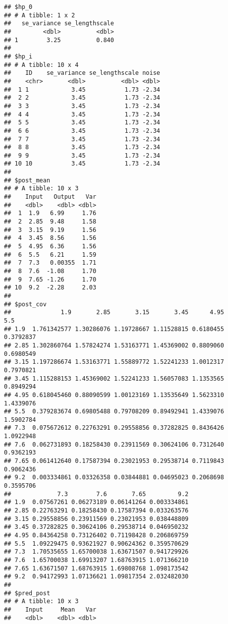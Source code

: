 \documentclass[
]{article}
\begin{document}
\begin{verbatim}
## $hp_0
## # A tibble: 1 x 2
##   se_variance se_lengthscale
##         <dbl>          <dbl>
## 1        3.25          0.840
## 
## $hp_i
## # A tibble: 10 x 4
##    ID    se_variance se_lengthscale noise
##    <chr>       <dbl>          <dbl> <dbl>
##  1 1            3.45           1.73 -2.34
##  2 2            3.45           1.73 -2.34
##  3 3            3.45           1.73 -2.34
##  4 4            3.45           1.73 -2.34
##  5 5            3.45           1.73 -2.34
##  6 6            3.45           1.73 -2.34
##  7 7            3.45           1.73 -2.34
##  8 8            3.45           1.73 -2.34
##  9 9            3.45           1.73 -2.34
## 10 10           3.45           1.73 -2.34
## 
## $post_mean
## # A tibble: 10 x 3
##    Input   Output   Var
##    <dbl>    <dbl> <dbl>
##  1  1.9   6.99     1.76
##  2  2.85  9.48     1.58
##  3  3.15  9.19     1.56
##  4  3.45  8.56     1.56
##  5  4.95  6.36     1.56
##  6  5.5   6.21     1.59
##  7  7.3   0.00355  1.71
##  8  7.6  -1.08     1.70
##  9  7.65 -1.26     1.70
## 10  9.2  -2.28     2.03
## 
## $post_cov
##              1.9       2.85       3.15       3.45      4.95       5.5
## 1.9  1.761342577 1.30286076 1.19728667 1.11528815 0.6180455 0.3792837
## 2.85 1.302860764 1.57824274 1.53163771 1.45369002 0.8809060 0.6980549
## 3.15 1.197286674 1.53163771 1.55889772 1.52241233 1.0012317 0.7970821
## 3.45 1.115288153 1.45369002 1.52241233 1.56057083 1.1353565 0.8949294
## 4.95 0.618045460 0.88090599 1.00123169 1.13535649 1.5623310 1.4339076
## 5.5  0.379283674 0.69805488 0.79708209 0.89492941 1.4339076 1.5902784
## 7.3  0.075672612 0.22763291 0.29558856 0.37282825 0.8436426 1.0922948
## 7.6  0.062731893 0.18258430 0.23911569 0.30624106 0.7312640 0.9362193
## 7.65 0.061412640 0.17587394 0.23021953 0.29538714 0.7119843 0.9062436
## 9.2  0.003334861 0.03326358 0.03844881 0.04695023 0.2068698 0.3595706
##             7.3        7.6       7.65         9.2
## 1.9  0.07567261 0.06273189 0.06141264 0.003334861
## 2.85 0.22763291 0.18258430 0.17587394 0.033263576
## 3.15 0.29558856 0.23911569 0.23021953 0.038448809
## 3.45 0.37282825 0.30624106 0.29538714 0.046950232
## 4.95 0.84364258 0.73126402 0.71198428 0.206869759
## 5.5  1.09229475 0.93621927 0.90624362 0.359570629
## 7.3  1.70535655 1.65700038 1.63671507 0.941729926
## 7.6  1.65700038 1.69913207 1.68763915 1.071366210
## 7.65 1.63671507 1.68763915 1.69808768 1.098173542
## 9.2  0.94172993 1.07136621 1.09817354 2.032482030
## 
## $pred_post
## # A tibble: 10 x 3
##    Input     Mean   Var
##    <dbl>    <dbl> <dbl>

\end{verbatim}
\end{document}
